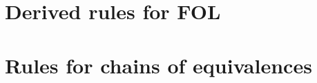 \begin{minipage}{\textwidth} %
\section{Derived rules for FOL}

\begin{multicols}{2}
\begin{fitchproof}
\end{fitchproof}
\begin{fitchproof}
\end{fitchproof}
\begin{fitchproof}
\end{fitchproof}
\begin{fitchproof}
\end{fitchproof}
\end{multicols}
\end{minipage}

\section{Rules for chains of equivalences}

